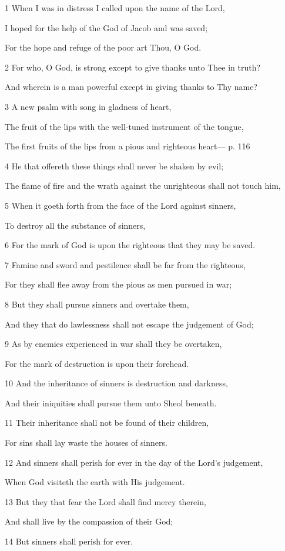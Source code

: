 \par 1 When I was in distress I called upon the name of the Lord,
\par  I hoped for the help of the God of Jacob and was saved;
\par  For the hope and refuge of the poor art Thou, O God.
\par 2 For who, O God, is strong except to give thanks unto Thee in truth?
\par  And wherein is a man powerful except in giving thanks to Thy name?
\par 3 A new psalm with song in gladness of heart,
\par  The fruit of the lips with the well-tuned instrument of the tongue,
\par  The first fruits of the lips from a pious and righteous heart— p. 116
\par 4 He that offereth these things shall never be shaken by evil;
\par  The flame of fire and the wrath against the unrighteous shall not touch him,
\par 5 When it goeth forth from the face of the Lord against sinners,
\par  To destroy all the substance of sinners,
\par 6 For the mark of God is upon the righteous that they may be saved.
\par    
\par 7 Famine and sword and pestilence shall be far from the righteous,
\par  For they shall flee away from the pious as men pursued in war;
\par 8 But they shall pursue sinners and overtake them,
\par  And they that do lawlessness shall not escape the judgement of God;
\par 9 As by enemies experienced in war shall they be overtaken,
\par  For the mark of destruction is upon their forehead.
\par 10 And the inheritance of sinners is destruction and darkness,
\par  And their iniquities shall pursue them unto Sheol beneath.
\par 11 Their inheritance shall not be found of their children,
\par  For sins shall lay waste the houses of sinners.
\par 12 And sinners shall perish for ever in the day of the Lord's judgement,
\par  When God visiteth the earth with His judgement.
\par 13 But they that fear the Lord shall find mercy therein,
\par  And shall live by the compassion of their God;
\par 14 But sinners shall perish for ever.




